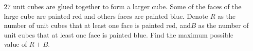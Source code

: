 $27$ unit cubes are glued together to form a larger cube. Some of the faces of the large cube are painted red and others faces are painted blue. Denote $R$ as the number of unit cubes that at least one face is painted red, and$ B$ as the number of unit cubes that at least one face is painted blue. Find the maximum possible value of $R+B$.
